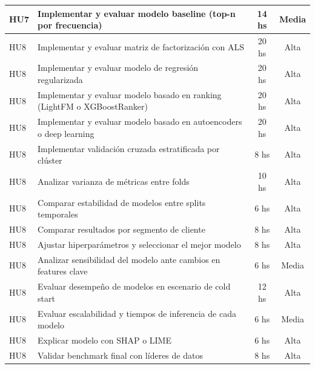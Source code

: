 \documentclass[
11pt, %
]{charter}
\begin{document}
\begin{longtable}{|p{2cm}|p{10cm}|c|c|}
HU7 & Implementar y evaluar modelo baseline (top-n por frecuencia) & 14 hs & Media \\ \hline

HU8 & Implementar y evaluar matriz de factorización con ALS & 20 hs & Alta \\ \hline
HU8 & Implementar y evaluar modelo de regresión regularizada & 20 hs & Alta \\ \hline
HU8 & Implementar y evaluar modelo basado en ranking (LightFM o XGBoostRanker) & 20 hs & Alta \\ \hline
HU8 & Implementar y evaluar modelo basado en autoencoders o deep learning & 20 hs & Alta \\ \hline
HU8 & Implementar validación cruzada estratificada por clúster & 8 hs & Alta \\ \hline
HU8 & Analizar varianza de métricas entre folds & 10 hs & Alta \\ \hline
HU8 & Comparar estabilidad de modelos entre splits temporales & 6 hs & Alta \\ \hline
HU8 & Comparar resultados por segmento de cliente & 8 hs & Alta \\ \hline
HU8 & Ajustar hiperparámetros y seleccionar el mejor modelo & 8 hs & Alta \\ \hline
HU8 & Analizar sensibilidad del modelo ante cambios en features clave & 6 hs & Media \\ \hline
HU8 & Evaluar desempeño de modelos en escenario de cold start & 12 hs & Alta \\ \hline
HU8 & Evaluar escalabilidad y tiempos de inferencia de cada modelo & 6 hs & Media \\ \hline
HU8 & Explicar modelo con SHAP o LIME & 6 hs & Alta \\ \hline
HU8 & Validar benchmark final con líderes de datos & 8 hs & Alta \\ \hline


\end{longtable}
\end{document}
